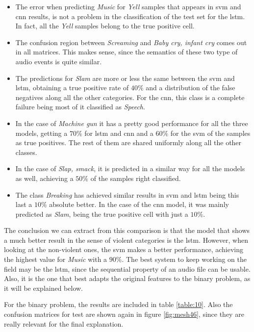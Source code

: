 	\begin{itemize}
		\item The error when predicting \textit{Music} for \textit{Yell} samples that appears in \acrshort{svm} and \acrshort{cnn} results, is not a problem in the classification of the test set for the \acrshort{lstm}. In fact, all the \textit{Yell} samples belong to the true positive cell.
		\item The confusion region between \textit{Screaming} and \textit{Baby cry, infant cry} comes out in all matrices. This makes sense, since the semantics of these two type of audio events is quite similar.
		\item The predictions for \textit{Slam} are more or less the same between the \acrshort{svm} and \acrshort{lstm}, obtaining a true positive rate of $40\%$ and a distribution of the false negatives along all the other categories. For the \acrshort{cnn}, this class is a complete failure being most of it classified as \textit{Speech}.
		\item In the case of \textit{Machine gun} it has a pretty good performance for all the three models, getting a $70\%$ for \acrshort{lstm} and \acrshort{cnn} and a $60\%$ for the \acrshort{svm} of the samples as true positives. The rest of them are shared uniformly along all the other classes.
		\item In the case of \textit{Slap, smack}, it is predicted in a similar way for all the models as well, achieving a $50\%$ of the samples right classified.
		\item The class \textit{Breaking} has achieved similar results in \acrshort{svm} and \acrshort{lstm} being this last a $10\%$ absolute better. In the case of the \acrshort{cnn} model, it was mainly predicted as \textit{Slam}, being the true positive cell with just a $10\%$.
	\end{itemize}
	
   The conclusion we can extract from this comparison is that the model that shows a much better result in the sense of violent categories is the \acrshort{lstm}. However, when looking at the non-violent ones, the \acrshort{svm} makes a better performance, achieving the highest value for \textit{Music} with a $90\%$. The best system to keep working on the field may be the \acrshort{lstm}, since the sequential property of an audio file can be usable.  Also, it is the one that best adapts the original features to the binary problem, as it will be explained below.
	
	For the binary problem, the results are included in table \ref{table:10}. Also the confusion matrices for test are shown again in figure \ref{fig:mesh46}, since they are really relevant for the final explanation.
	
